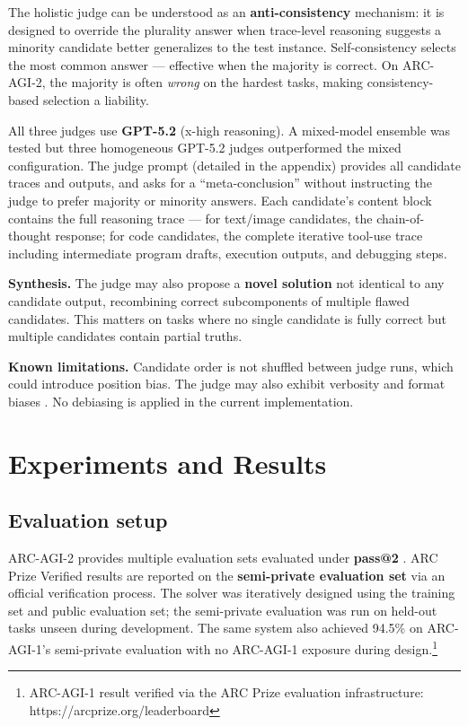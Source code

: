 \documentclass[10pt]{article}
\begin{document}
The holistic judge can be understood as an \textbf{anti-consistency}
mechanism: it is designed to override the plurality answer when
trace-level reasoning suggests a minority candidate better generalizes
to the test instance. Self-consistency \citep{wang2022selfconsistency}
selects the most common answer --- effective when the majority is
correct. On ARC-AGI-2, the majority is often \emph{wrong} on the hardest
tasks, making consistency-based selection a liability.

All three judges use \textbf{GPT-5.2} (x-high reasoning). A mixed-model
ensemble was tested but three homogeneous GPT-5.2 judges outperformed
the mixed configuration. The judge prompt (detailed in the appendix)
provides all candidate traces and outputs, and asks for a
``meta-conclusion'' without instructing the judge to prefer majority or
minority answers. Each candidate's content block contains the full
reasoning trace --- for text/image candidates, the chain-of-thought
response; for code candidates, the complete iterative tool-use trace
including intermediate program drafts, execution outputs, and debugging
steps.

\textbf{Synthesis.} The judge may also propose a \textbf{novel solution}
not identical to any candidate output, recombining correct subcomponents
of multiple flawed candidates. This matters on tasks where no single
candidate is fully correct but multiple candidates contain partial
truths.

\textbf{Known limitations.} Candidate order is not shuffled between
judge runs, which could introduce position bias. The judge may also
exhibit verbosity and format biases \citep{zheng2023judging}. No
debiasing is applied in the current implementation.

\hypertarget{experiments-and-results}{%
\section{Experiments and Results}\label{experiments-and-results}}

\hypertarget{evaluation-setup}{%
\subsection{Evaluation setup}\label{evaluation-setup}}

ARC-AGI-2 provides multiple evaluation sets evaluated under
\textbf{pass@2} \citep{arcprize2024report}. ARC Prize Verified results
are reported on the \textbf{semi-private evaluation set} via an official
verification process. The solver was iteratively designed using the
training set and public evaluation set; the semi-private evaluation was
run on held-out tasks unseen during development. The same system also
achieved 94.5\% on ARC-AGI-1's semi-private evaluation with no ARC-AGI-1
exposure during design.\footnote{ARC-AGI-1 result verified via the ARC
  Prize evaluation infrastructure: https://arcprize.org/leaderboard}
\end{document}
